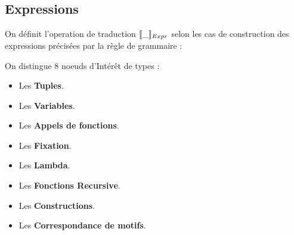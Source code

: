 \documentclass[
  12pt,
]{article}
\providecommand{\tightlist}{%
  \setlength{\itemsep}{0pt}\setlength{\parskip}{0pt}}
\begin{document}
\subsection{Expressions}\label{exprs}

On définit l'operation de traduction \(\llbracket \_ \rrbracket_{Expr}\) selon les cas de construction
des expressions précisées par la règle de grammaire : 

On distingue 8 noeuds d'Intérêt de types :
\begin{itemize}
  \tightlist
  \item
        Les \textbf{Tuples}.
  \item
        Les \textbf{Variables}.
  \item
        Les \textbf{Appels de fonctions}.
  \item
        Les \textbf{Fixation}.
  \item
        Les \textbf{Lambda}.
  \item
        Les \textbf{Fonctions Recursive}.
  \item
        Les \textbf{Constructions}.
  \item
        Les \textbf{Correspondance de motifs}.
\end{itemize}
\end{document}
